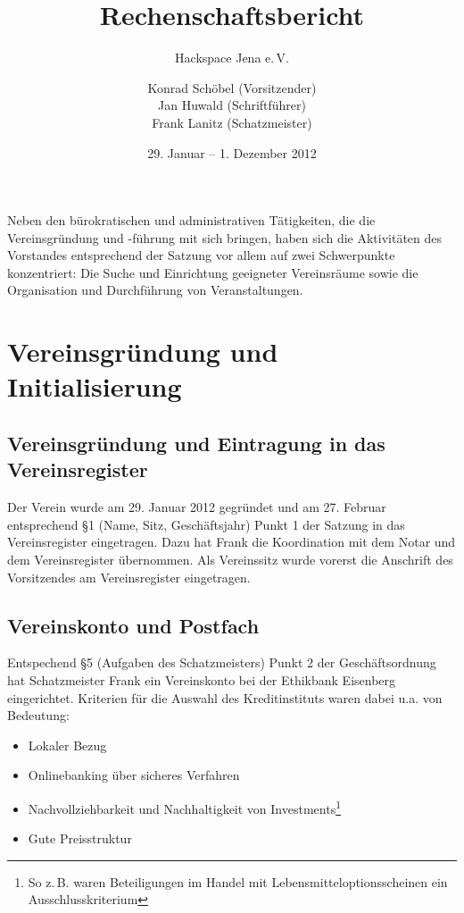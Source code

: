 \documentclass[10pt,DIV16]{scrartcl}
\title{Rechenschaftsbericht}
\subtitle{Hackspace Jena e.\,V.}
\author{%
	Konrad Schöbel (Vorsitzender)\\
	Jan Huwald (Schriftf\"uhrer)\\
	Frank Lanitz (Schatzmeister)
}
\date{29. Januar -- 1. Dezember 2012}
\begin{document}
\maketitle{}

\tableofcontents{}

\newpage{}

Neben den bürokratischen und administrativen Tätigkeiten, die die
Vereinsgründung und -führung mit sich bringen, haben sich die Aktivitäten des
Vorstandes entsprechend der Satzung vor allem auf zwei Schwerpunkte
konzentriert: Die Suche und Einrichtung geeigneter Vereinsräume sowie die
Organisation und Durchführung von Veranstaltungen.


\section{Vereinsgründung und Initialisierung}

\subsection{Vereinsgründung und Eintragung in das Vereinsregister}

Der Verein wurde am 29. Januar 2012 gegründet und am 27. Februar 
entsprechend §1 (Name, Sitz, Geschäftsjahr) Punkt 1 der Satzung in 
das Vereinsregister eingetragen. Dazu hat Frank die Koordination mit 
dem Notar und dem Vereinsregister übernommen. Als Vereinssitz wurde 
vorerst die Anschrift des Vorsitzendes am Vereinsregister 
eingetragen. 

\subsection{Vereinskonto und Postfach}

Entspechend §5 (Aufgaben des Schatzmeisters) Punkt 2 der Geschäftsordnung hat
Schatzmeister Frank ein Vereinskonto bei der Ethikbank Eisenberg eingerichtet.
Kriterien für die Auswahl des Kreditinstituts waren dabei u.a. von Bedeutung: 

\begin{itemize}
	\item Lokaler Bezug
	\item Onlinebanking über sicheres Verfahren
	\item Nachvollziehbarkeit und Nachhaltigkeit von Investments\footnote{So 
		z.\,B. waren Beteiligungen im Handel mit Lebensmitteloptionsscheinen 
		ein Ausschlusskriterium}
	\item Gute Preisstruktur
\end{itemize}
\end{document}
